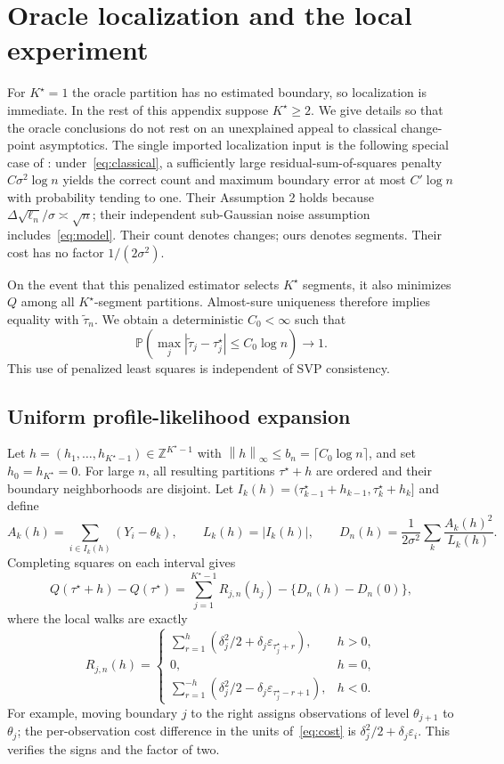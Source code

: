 \documentclass[pdflatex,sn-mathphys-num]{sn-jnl}
\newcommand{\Prob}{\mathbb P}
\newcommand{\Z}{\mathbb Z}
\newcommand{\taus}{\tau^\star}
\newcommand{\tol}{\widetilde\tau_n}
\newcommand{\norm}[1]{\left\lVert#1\right\rVert}
\theoremstyle{thmstyleone}
\theoremstyle{thmstyletwo}
\begin{document}
\section{Oracle localization and the local experiment}\label{app:oracle}

For $K^\star=1$ the oracle partition has no estimated boundary, so localization
is immediate. In the rest of this appendix suppose $K^\star\ge2$.
We give details so that the oracle conclusions do not rest on an unexplained
appeal to classical change-point asymptotics. The single imported localization
input is the following special case of \cite[Theorem 3, pp.~1926--1927]{wang2020}:
under~\eqref{eq:classical}, a sufficiently large residual-sum-of-squares penalty
$C\sigma^2\log n$ yields the correct count and maximum boundary error at most
$C'\log n$ with probability tending to one. Their Assumption 2 holds because
$\Delta\sqrt{\ell_n}/\sigma\asymp\sqrt n$; their independent sub-Gaussian
noise assumption includes~\eqref{eq:model}. Their count denotes changes;
ours denotes segments. Their cost has no factor $1/(2\sigma^2)$.

On the event that this penalized estimator selects $K^\star$ segments, it
also minimizes $Q$ among all $K^\star$-segment partitions. Almost-sure
uniqueness therefore implies equality with $\tol$. We obtain a deterministic
$C_0<\infty$ such that
\begin{equation}\label{eq:oracle-log}
\Prob\left(\max_j|\widetilde\tau_j-\taus_j|\le C_0\log n\right)\to1.
\end{equation}
This use of penalized least squares is independent of SVP consistency.

\subsection{Uniform profile-likelihood expansion}
Let $h=(h_1,\ldots,h_{K^\star-1})\in\Z^{K^\star-1}$ with
$\norm h_\infty\le b_n=\lceil C_0\log n\rceil$, and set $h_0=h_{K^\star}=0$.
For large $n$, all resulting partitions $\taus+h$ are ordered and their
boundary neighborhoods are disjoint.
Let $I_k(h)=(\taus_{k-1}+h_{k-1},\taus_k+h_k]$ and define
\[
A_k(h)=\sum_{i\in I_k(h)}(Y_i-\theta_k),\qquad L_k(h)=|I_k(h)|,
\qquad D_n(h)=\frac{1}{2\sigma^2}\sum_k\frac{A_k(h)^2}{L_k(h)}.
\]
Completing squares on each interval gives
\begin{equation}\label{eq:profile}
Q(\taus+h)-Q(\taus)
=\sum_{j=1}^{K^\star-1}R_{j,n}(h_j)-\{D_n(h)-D_n(0)\},
\end{equation}
where the local walks are exactly
\[
R_{j,n}(h)=
\begin{cases}
\displaystyle\sum_{r=1}^{h}\left(\delta_j^2/2+
\delta_j\varepsilon_{\taus_j+r}\right),&h>0,\\
0,&h=0,\\
\displaystyle\sum_{r=1}^{-h}\left(\delta_j^2/2-
\delta_j\varepsilon_{\taus_j-r+1}\right),&h<0.
\end{cases}
\]
For example, moving boundary $j$ to the right assigns observations of level
$\theta_{j+1}$ to $\theta_j$; the per-observation cost difference in the
units of~\eqref{eq:cost} is $\delta_j^2/2+\delta_j\varepsilon_i$.
This verifies the signs and the factor of two.
\end{document}
